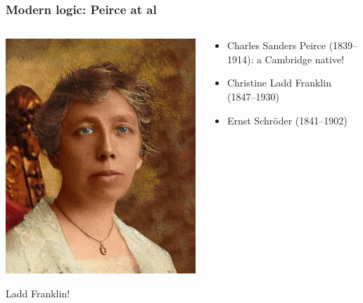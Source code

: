 \begin{frame}
  \frametitle{Modern logic: Peirce at al}

  \begin{columns}
    \begin{column}{.5\textwidth}
      \includegraphics[height=.8\textheight]{../assets/ladd-franklin}
      
      Ladd Franklin!
    \end{column}
    \begin{column}{.5\textwidth}
      \begin{itemize}[<+->]
        \item Charles Sanders Peirce (1839--1914): a Cambridge native! 
        \item Christine Ladd Franklin (1847--1930)
        \item Ernst Schr\"oder (1841--1902)
      \end{itemize}
    \end{column}
  \end{columns}
\end{frame}

